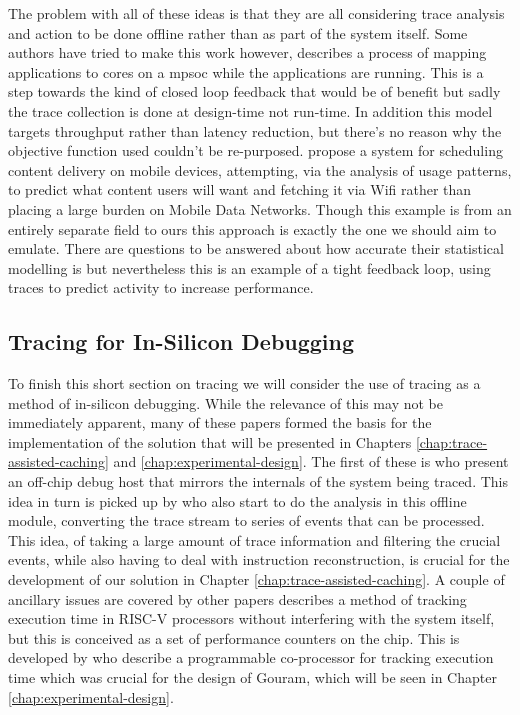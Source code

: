 The problem with all of these ideas is that they are all considering trace analysis and action to be done offline rather than as part of the system itself. Some authors have tried to make this work however, \citet{singhResourceThroughputAware2016} describes a process of mapping applications to cores on a \gls{mpsoc} while the applications are running. This is a step towards the kind of closed loop feedback that would be of benefit but sadly the trace collection is done at design-time not run-time. In addition this model targets throughput rather than latency reduction, but there's no reason why the objective function used couldn't be re-purposed. \citet{shoukryProactiveSchedulingContent2014} propose a system for scheduling content delivery on mobile devices, attempting, via the analysis of usage patterns, to predict what content users will want and fetching it via Wifi rather than placing a large burden on Mobile Data Networks. Though this example is from an entirely separate field to ours this approach is exactly the one we should aim to emulate. There are questions to be answered about how accurate their statistical modelling is but nevertheless this is an example of a tight feedback loop, using traces to predict activity to increase performance. 

\subsection{Tracing for In-Silicon Debugging}

To finish this short section on tracing we will consider the use of tracing as a method of in-silicon debugging. While the relevance of this may not be immediately apparent, many of these papers formed the basis for the implementation of the solution that will be presented in Chapters \ref{chap:trace-assisted-caching} and \ref{chap:experimental-design}. The first of these is \citet{uzelacHardwareBasedLoadValue2013} who present an off-chip debug host that mirrors the internals of the system being traced. This idea in turn is picked up by \citet{deckerOnlineAnalysisDebug2018} who also start to do the analysis in this offline module, converting the trace stream to series of events that can be processed. This idea, of taking a large amount of trace information and filtering the crucial events, while also having to deal with instruction reconstruction, is crucial for the development of our solution in Chapter \ref{chap:trace-assisted-caching}. A couple of ancillary issues are covered by other papers \citet{scheipelSystemAwarePerformanceMonitoring2017} describes a method of tracking execution time in RISC-V processors without interfering with the system itself, but this is conceived as a set of performance counters on the chip. This is developed by \citet{delshadtehraniNileProgrammableMonitoring2018} who describe a programmable co-processor for tracking execution time which was crucial for the design of Gouram, which will be seen in Chapter \ref{chap:experimental-design}. 

